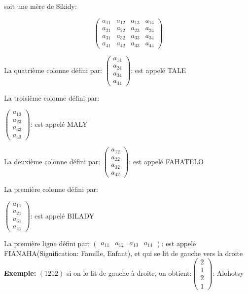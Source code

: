 \documentclass[12pt]{report}
\begin{document}
soit une mère de Sikidy:

\[
\begin{pmatrix}
a_{11} & a_{12} & a_{13} & a_{14} \\
a_{21} & a_{22} & a_{23} & a_{24} \\
a_{31} & a_{32} & a_{33} & a_{34} \\
a_{41} & a_{42} & a_{43} & a_{44}
\end{pmatrix}
\]

La quatrième colonne défini par:\newline
$
\begin{pmatrix}
 a_{14} \\
 a_{24} \\
 a_{34} \\
 a_{44}
\end{pmatrix}
$: est appelé TALE \newline

La troisième colonne défini par: \newline

$
\begin{pmatrix}
a_{13} \\
a_{23} \\
a_{33} \\
a_{43}
\end{pmatrix}
$: est appelé MALY \newline

La deuxième colonne défini par:\newline
$
\begin{pmatrix}
a_{12} \\
a_{22} \\
a_{32} \\
a_{42}
\end{pmatrix}
$: est appelé FAHATELO \newline

La première colonne défini par: \newline

$
\begin{pmatrix}
a_{11} \\
a_{21} \\
a_{31} \\
a_{41}
\end{pmatrix}
$: est appelé BILADY \newline

La première ligne défini par: \newline
$ \begin{pmatrix}
a_{11} & a_{12} & a_{13} & a_{14}
\end{pmatrix} $: est appelé FIANAHA(Signification: Famille, Enfant), et qui se lit de gauche vers la droite \newline
\textbf{Exemple:} $(1 2 1 2)$ si on le lit de gauche à droite, on obtient:$\begin{pmatrix}
2 \\
1 \\
2 \\
1
\end{pmatrix}$: Alohotsy\newline
\end{document}
